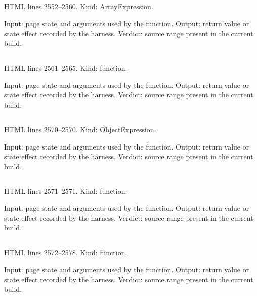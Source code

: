 \subsection*{\texttt{}}
\label{vf_65_ANALYSIS_KINDS}
HTML lines 2552--2560. Kind: ArrayExpression.

Input: page state and arguments used by the function.
Output: return value or state effect recorded by the harness.
Verdict: source range present in the current build.

\subsection*{\texttt{}}
\label{vf_66_analysisKind}
HTML lines 2561--2565. Kind: function.

Input: page state and arguments used by the function.
Output: return value or state effect recorded by the harness.
Verdict: source range present in the current build.

\subsection*{\texttt{}}
\label{vf_67_LC_CALC_STATE_LABELS}
HTML lines 2570--2570. Kind: ObjectExpression.

Input: page state and arguments used by the function.
Output: return value or state effect recorded by the harness.
Verdict: source range present in the current build.

\subsection*{\texttt{}}
\label{vf_68_calcStateLabel}
HTML lines 2571--2571. Kind: function.

Input: page state and arguments used by the function.
Output: return value or state effect recorded by the harness.
Verdict: source range present in the current build.

\subsection*{\texttt{}}
\label{vf_69_cpMethodOf}
HTML lines 2572--2578. Kind: function.

Input: page state and arguments used by the function.
Output: return value or state effect recorded by the harness.
Verdict: source range present in the current build.


